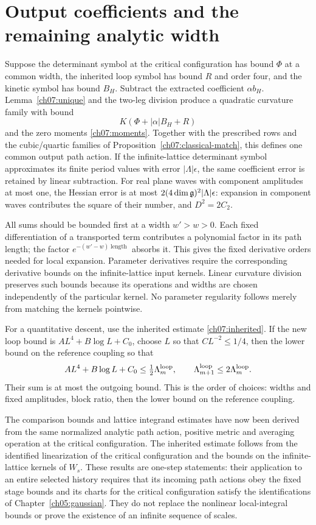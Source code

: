 \section{Output coefficients and the remaining analytic width}\label{ch07:output}

Suppose the determinant symbol at the critical configuration has bound $\Phi$ at a common
width, the inherited loop symbol has bound $R$ and order four, and the
kinetic symbol has bound $B_H$. Subtract the extracted coefficient
$\alpha b_H$. Lemma~\ref{ch07:unique} and the two-leg division produce
a quadratic curvature family with bound
\[
 K(\Phi+|\alpha|B_H+R)
\]
and the zero moments \eqref{ch07:moments}. Together with the prescribed
rows and the cubic/quartic families of
Proposition~\ref{ch07:classical-match}, this defines one common output
path action. If the infinite-lattice determinant symbol approximates its finite
period values with error $|\Lambda|\epsilon$, the same coefficient
error is retained by linear subtraction. For real plane waves with
component amplitudes at most one, the Hessian error is at most
$2(4\dim\mathfrak g)^2|\Lambda|\epsilon$: expansion in component waves
contributes the square of their number, and $D^2=2C_2$.

All sums should be bounded first at a width $w'>w>0$.
Each fixed differentiation of a transported term contributes a polynomial factor in
its path length; the factor $e^{-(w'-w)\operatorname{length}}$ absorbs
it. This gives the fixed derivative orders needed for local expansion.
Parameter derivatives require the corresponding derivative bounds on
the infinite-lattice input kernels. Linear curvature division preserves such
bounds because its operations and widths are chosen independently of
the particular kernel. No parameter regularity follows merely from
matching the kernels pointwise.

For a quantitative descent, use the inherited estimate
\eqref{ch07:inherited}. If the new loop
bound is $A L^4+B\log L+C_0$, choose $L$ so that $CL^{-2}\le1/4$,
then the lower bound on the reference coupling so that
\[
 A L^4+B\log L+C_0\le\tfrac12\Lambda_m^{\rm loop},\qquad
 \Lambda_{m+1}^{\rm loop}\le2\Lambda_m^{\rm loop}.
\]
Their sum is at most the outgoing bound. This is the order of choices:
widths and fixed amplitudes, block ratio, then the lower bound on the reference coupling.

The comparison bounds and lattice integrand estimates have now been
derived from the same normalized analytic path action, positive metric and
averaging operation at the critical configuration. The inherited estimate follows from the
identified linearization of the critical configuration and the bounds on the infinite-lattice kernels of $W_s$. These results are
one-step statements: their application to an entire selected history
requires that its incoming path actions obey the fixed stage bounds and its
charts for the critical configuration satisfy the identifications of Chapter~\ref{ch05:gaussian}.
They do not replace the nonlinear local-integral bounds or prove the
existence of an infinite sequence of scales.
